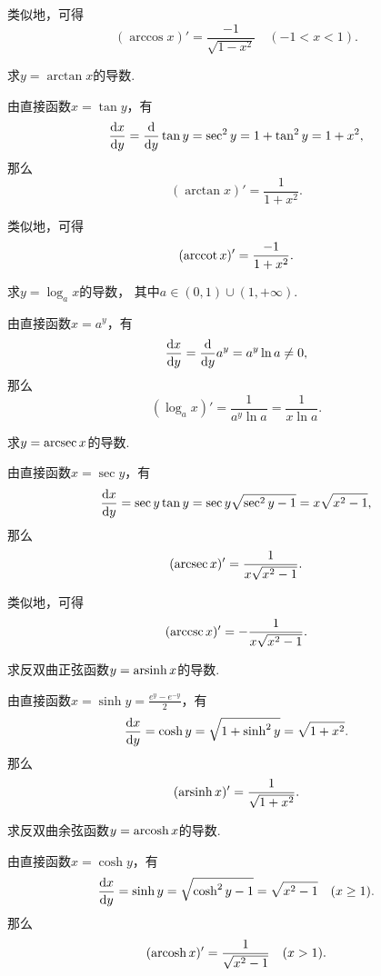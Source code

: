 类似地，可得\[
	(\arccos x)' = \frac{-1}{\sqrt{1 - x^2}}
	\quad(-1<x<1).
\]

\begin{example}
求\(y=\arctan x\)的导数.
\begin{solution}
由直接函数\(x=\tan y\)，有\[
	\dv{x}{y}
	= \dv{y} \tan y
	= \sec^2 y
	= 1 + \tan^2 y
	= 1 + x^2,
\]
那么\[
	(\arctan x)' = \frac1{1+x^2}.
\]
\end{solution}
\end{example}

类似地，可得\[
	(\arccot x)' = \frac{-1}{1+x^2}.
\]

\begin{example}
求\(y=\log_a x\)的导数，
其中\(a\in(0,1)\cup(1,+\infty)\).
\begin{solution}
由直接函数\(x=a^y\)，有\[
	\dv{x}{y} = \dv{y} a^y = a^y \ln a \neq 0,
\]
那么\[
	(\log_a x)' = \frac1{a^y \ln a} = \frac1{x \ln a}.
\]
\end{solution}
\end{example}

\begin{example}
求\(y = \arcsec x\)的导数.
\begin{solution}
由直接函数\(x=\sec y\)，有\[
	\dv{x}{y}
	= \sec y \tan y
	= \sec y \sqrt{\sec^2 y-1}
	= x \sqrt{x^2-1},
\]
那么\[
	(\arcsec x)'
	= \frac1{x \sqrt{x^2-1}}.
\]
\end{solution}
\end{example}

类似地，可得\[
	(\arccsc x)'
	= -\frac1{x \sqrt{x^2-1}}.
\]

\begin{example}
求反双曲正弦函数\(y = \operatorname{arsinh} x\)的导数.
\begin{solution}
由直接函数\(x = \sinh y = \frac{e^y - e^{-y}}2\)，有\[
	\dv{x}{y}
	= \cosh y
	= \sqrt{1 + \sinh^2 y}
	= \sqrt{1 + x^2}.
\]
那么\[
	(\operatorname{arsinh} x)' = \frac1{\sqrt{1+x^2}}.
\]
\end{solution}
\end{example}

\begin{example}
求反双曲余弦函数\(y = \operatorname{arcosh} x\)的导数.
\begin{solution}
由直接函数\(x = \cosh y\)，有\[
	\dv{x}{y}
	= \sinh y
	= \sqrt{\cosh^2 y - 1}
	= \sqrt{x^2 - 1}
	\quad(x\geq1).
\]
那么\[
	(\operatorname{arcosh} x)' = \frac1{\sqrt{x^2-1}}
	\quad(x>1).
\]
\end{solution}
\end{example}

